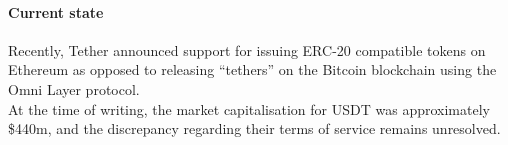 \paragraph{Current state}

Recently, Tether announced support for issuing ERC-20 compatible tokens on Ethereum as opposed to releasing ``tethers'' on the Bitcoin blockchain using the Omni Layer protocol. \\

\noindent At the time of writing, the market capitalisation for USDT was approximately \$440m, and the discrepancy regarding their terms of service remains unresolved. \\










\pagebreak